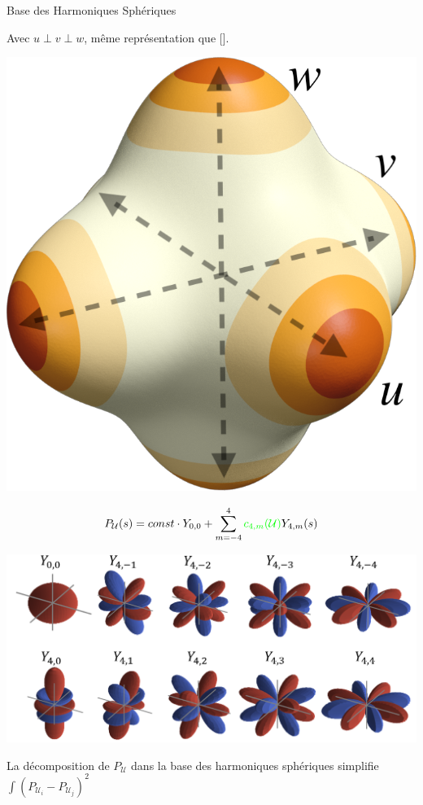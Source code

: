 \begin{frame}{Base des Harmoniques Sphériques}
    \centering
    \begin{overprint}
     \centering
    Avec $u \perp v \perp w$, même représentation que [\cite{huang_boundary_2011}].\\
    
    \begin{minipage}[c]{0.24\textwidth}
        \centering
          \vspace*{.5\baselineskip}
          \hfill
        \includegraphics[width=0.6\linewidth]{img_spm_ff/sperical_3dir4.png}
    \end{minipage}
    \begin{minipage}[c]{0.74\textwidth}
        $$P_\mathcal{U}(s) = const \cdot Y_{0, 0} + \sum_{m = -4}^4{{\color{green}c_{4, m}(\mathcal{U})}Y_{4,m}(s)}$$ 
    \end{minipage}
    
    \includegraphics[width=.8\linewidth]{img_spm_ff/ortho_harmonic_decompo.PNG} 
    
     \centering
        La décomposition de $P_\mathcal{U}$ dans la base des harmoniques sphériques simplifie $\displaystyle\int (P_{\mathcal{U}_i} - P_{\mathcal{U}_j})^2$ \\
    

\end{overprint}
\end{frame}
